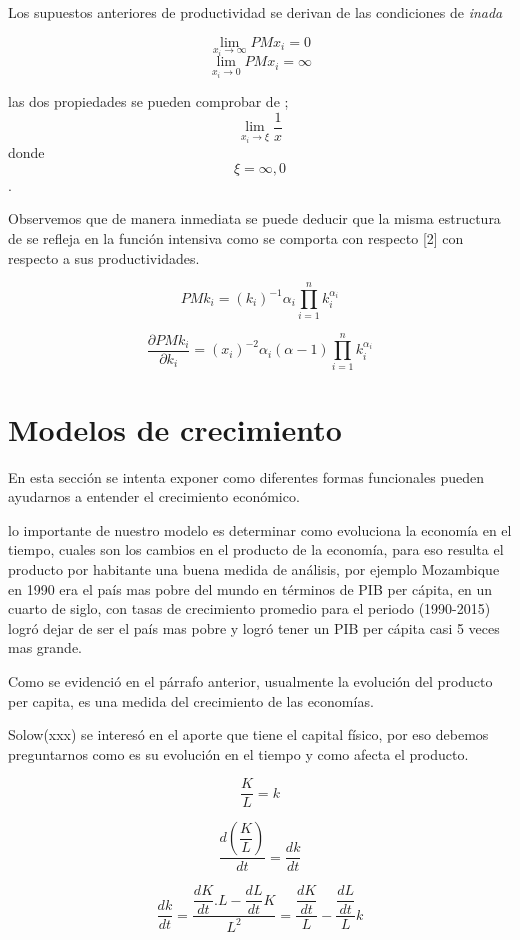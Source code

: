 \documentclass[12pt]{article}
\begin{document}
Los supuestos anteriores de productividad se derivan de las condiciones de \textit{inada}

$$\lim_{x_i\longrightarrow \infty}PMx_i=0$$
$$\lim_{x_i\longrightarrow 0}PMx_i=\infty$$

\newpage
las dos propiedades se pueden comprobar de ;
$$\lim_{x_i\longrightarrow \xi}\frac{1}{x}$$ donde $$ {\xi=\infty, 0}$$.



Observemos que de manera inmediata se puede deducir que la misma estructura de se refleja en la función intensiva como se comporta con respecto [2] con respecto a sus productividades.



$$PMk_i=(k_i)^{-1}\alpha_i\prod_{i=1}^nk_i^{\alpha_i}$$




$$\frac{\partial PMk_i}{\partial k_i}=(x_i)^{-2}\alpha_i(\alpha - 1)\prod_{i=1}^nk_i^{\alpha_i}$$

\section{Modelos de crecimiento}
En esta sección se intenta exponer como diferentes formas funcionales pueden ayudarnos a entender el crecimiento económico.

lo importante de nuestro modelo es determinar como evoluciona la economía en el tiempo, cuales son los cambios en el producto de la economía, para eso resulta el producto por habitante una buena medida de análisis, por ejemplo Mozambique en 1990 era el país mas pobre del mundo en términos de PIB per cápita, en un cuarto de siglo, con tasas de crecimiento promedio para el periodo (1990-2015) logró dejar de ser el país mas pobre y logró tener un PIB per cápita casi 5 veces mas grande.





Como se evidenció en el párrafo anterior, usualmente la evolución del producto per capita, es una medida del crecimiento de las economías.

Solow(xxx) se interesó en el aporte que tiene el capital físico, por eso debemos preguntarnos como es su evolución en el tiempo y como afecta el producto.



$$\dfrac{K}{L} =k $$

$$ \dfrac{d(\dfrac{K}{L})}{dt}= \dfrac {dk}{dt}$$


$$ \dfrac{dk}{dt}=\dfrac{\dfrac{dK}{dt}.L-\dfrac{dL}{dt}K}{L^{2}} = \dfrac{\dfrac{dK}{dt}}{L}-\dfrac{\dfrac{dL}{dt}}{L}k$$
\end{document}
